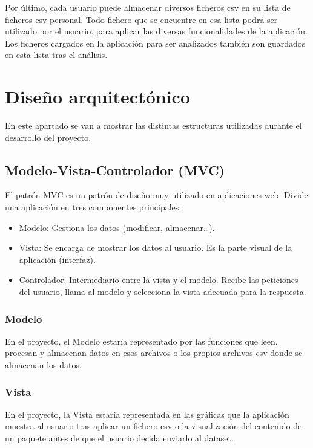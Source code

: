 Por último, cada usuario puede almacenar diversos ficheros csv en su lista de ficheros csv personal. Todo fichero que se encuentre en esa lista podrá ser utilizado por el usuario. para aplicar las diversas funcionalidades de la aplicación. Los ficheros cargados en la aplicación para ser analizados también son guardados en esta lista tras el análisis. 

\section{Diseño arquitectónico}
En este apartado se van a mostrar las distintas estructuras utilizadas durante el desarrollo del proyecto.

\subsection{Modelo-Vista-Controlador (MVC)}

El patrón MVC es un patrón de diseño muy utilizado en aplicaciones web. Divide una aplicación en tres componentes principales:

\begin{itemize}
    \item Modelo: Gestiona los datos (modificar, almacenar\ldots).
    \item Vista: Se encarga de mostrar los datos al usuario. Es la parte visual de la aplicación (interfaz).
    \item Controlador: Intermediario entre la vista y el modelo. Recibe las peticiones del usuario, llama al modelo y selecciona la vista adecuada para la respuesta.
\end{itemize}

\subsubsection{Modelo}
En el proyecto, el Modelo estaría representado por las funciones que leen, procesan y almacenan datos en esos archivos o los propios archivos csv donde se almacenan los datos.

\subsubsection{Vista}
En el proyecto, la Vista estaría representada en las gráficas que la aplicación muestra al usuario tras aplicar un fichero csv o la visualización del contenido de un paquete antes de que el usuario decida enviarlo al dataset.

